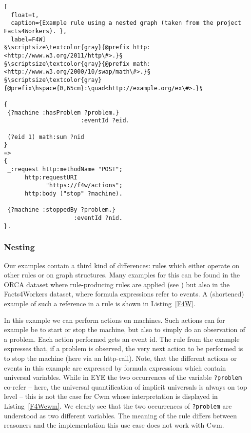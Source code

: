 \begin{lstlisting}[
  float=t,
  caption={Example rule using a nested graph (taken from the project Facts4Workers). },
  label=F4W]
§\scriptsize\textcolor{gray}{@prefix http: <http://www.w3.org/2011/http\#>.}§
§\scriptsize\textcolor{gray}{@prefix math: <http://www.w3.org/2000/10/swap/math\#>.}§
§\scriptsize\textcolor{gray}{@prefix\hspace{0,65cm}:\quad<http://example.org/ex\#>.}§
 
{  
 {?machine :hasProblem ?problem.} 
                      :eventId ?eid.
 
 (?eid 1) math:sum ?nid
}
=>
{
 _:request http:methodName "POST";
      http:requestURI 
            "https://f4w/actions";
      http:body ("stop" ?machine).
      
 {?machine :stoppedBy ?problem.} 
                    :eventId ?nid.
}. 
\end{lstlisting}
\subsubsection{Nesting}\label{nest}

Our examples contain a third kind of differences:
rules which either operate on other rules or on graph structures. Many examples for this can be found in the 
ORCA dataset where rule-producing rules are applied (see \cite{ORCA2}) but also  in the Facts4Workers dataset, where formula expressions 
refer to events.
A (shortened) example of such a reference in a rule is shown in Listing~\ref{F4W}. 

In this example we can perform actions on machines. Such actions can for example be to start or stop the machine, but also to simply do an observation of a problem. Each action performed gets an event id. 
The rule from the example expresses that, if a problem is observed, the very next action to be performed is to stop the machine (here via an http-call). Note, that the different actions or events in this example 
are expressed by formula expressions which contain universal variables. While in EYE the two occurrences of the variable \texttt{?problem} co-refer -- here, 
the universal quantification of implicit universals is always on top level -- this is not the case for Cwm whose interpretation is displayed in Listing~\ref{F4Wcwm}.
We clearly see that the two occurrences of  
\texttt{?problem} are understood as two different variables. The meaning of the rule differs between reasoners 
and the implementation  this use case  does not work with Cwm. 

